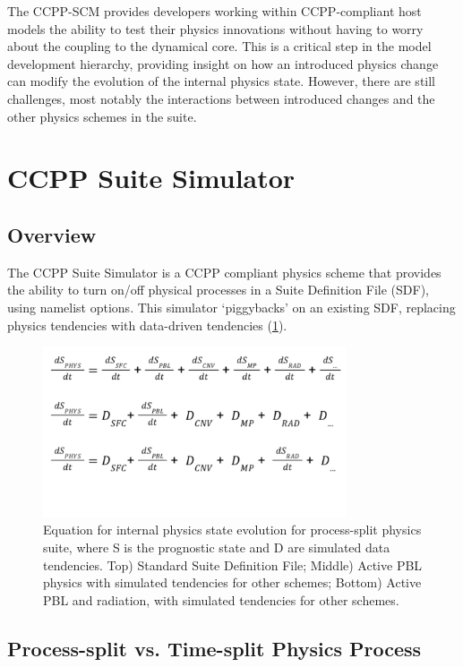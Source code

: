 The CCPP-SCM provides developers working within CCPP-compliant host models the ability to test their physics innovations without having to worry about the coupling to the dynamical core. This is a critical step in the model development hierarchy, providing insight on how an introduced physics change can modify the evolution of the internal physics state. However, there are still challenges, most notably the interactions between introduced changes and the other physics schemes in the suite.

\section{CCPP Suite Simulator}

\subsection{Overview}

The CCPP Suite Simulator is a CCPP compliant physics scheme that provides the ability to turn on/off physical processes in a Suite Definition File (SDF), using namelist options. This simulator `piggybacks' on an existing SDF, replacing physics tendencies with data-driven tendencies (\ref{fig:CSS_tendency_schematic}). 

\begin{figure}[h]
    \centering
    \includegraphics[width=0.80\textwidth]{images/CSS_tendency_schematic.png}
    \caption{Equation for internal physics state evolution for process-split physics suite, where S is the prognostic state and D are simulated data tendencies. Top) Standard Suite Definition File; Middle) Active PBL physics with simulated tendencies for other schemes; Bottom) Active PBL and radiation, with simulated tendencies for other schemes.}
    \label{fig:CSS_tendency_schematic}
\end{figure}

\subsection{Process-split vs. Time-split Physics Process}

